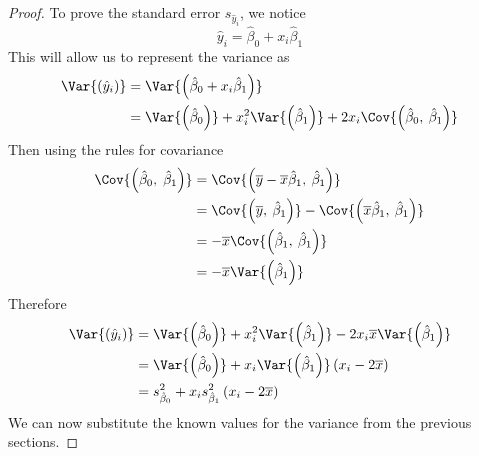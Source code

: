 \documentclass{article}
\begin{document}
\begin{proof}
    To prove the standard error \(s_{\hat{y}_i}\), we notice
    \begin{equation*}
        \hat{y}_i = \hat{\beta}_0 + x_i \hat{\beta}_1
    \end{equation*}
    This will allow us to represent the variance as
    \begin{align*}
        \Var{\left( \hat{y}_i \right)} & = \Var{\left( \hat{\beta}_0 + x_i \hat{\beta}_1 \right)}                                                                                    \\
                                       & = \Var{\left( \hat{\beta}_0 \right)} + x_i^2 \Var{\left( \hat{\beta}_1 \right)} + 2 x_i \Cov{\left( \hat{\beta}_0,\: \hat{\beta}_1 \right)}
    \end{align*}
    Then using the rules for covariance
    \begin{align*}
        \Cov{\left( \hat{\beta}_0,\; \hat{\beta}_1 \right)} & = \Cov{\left( \overline{y} - \overline{x} \hat{\beta}_1,\: \hat{\beta}_1 \right)}                                       \\
                                                            & = \Cov{\left( \overline{y},\: \hat{\beta}_1 \right)} - \Cov{\left( \overline{x} \hat{\beta}_1,\: \hat{\beta}_1 \right)} \\
                                                            & = - \overline{x} \Cov{\left( \hat{\beta}_1,\: \hat{\beta}_1 \right)}                                                    \\
                                                            & = - \overline{x} \Var{\left( \hat{\beta}_1 \right)}
    \end{align*}
    Therefore
    \begin{align*}
        \Var{\left( \hat{y}_i \right)} & = \Var{\left( \hat{\beta}_0 \right)} + x_i^2 \Var{\left( \hat{\beta}_1 \right)} - 2 x_i \overline{x} \Var{\left( \hat{\beta}_1 \right)} \\
                                       & = \Var{\left( \hat{\beta}_0 \right)} + x_i \Var{\left( \hat{\beta}_1 \right)} \left( x_i - 2 \overline{x} \right)                       \\
                                       & = s_{\hat{\beta}_0}^2 + x_i s_{\hat{\beta}_1}^2 \left( x_i - 2 \overline{x} \right)
    \end{align*}
    We can now substitute the known values for the variance from the previous sections.
    \begingroup

\end{proof}
\end{document}
